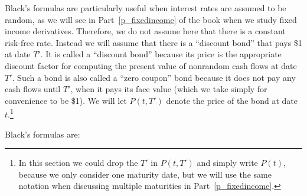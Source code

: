 Black's formulas are particularly useful when interest rates are assumed to be random, as we will see in Part~\ref{p_fixedincome} of the book when we study fixed income derivatives.  Therefore, we do not assume here that there is a constant risk-free rate. Instead we will assume that there is a ``discount bond'' that pays \$1 at date $T'$.  It is called a ``discount bond''  because its price is the appropriate discount factor for computing the present value of nonrandom cash flows at date $T'$.  Such a bond is also called a ``zero coupon'' bond  because it does not pay any cash flows until $T'$, when it pays its face value (which we take simply for convenience to be \$1).   We will let $P(t,T')$ denote the price of the bond at date $t$.\footnote{In this section we could drop the $T'$ in $P(t,T')$ and simply write $P(t)$, because we only consider one maturity date, but we will use the same notation when discussing multiple maturities in Part~\ref{p_fixedincome}.}

Black's formulas are: 

